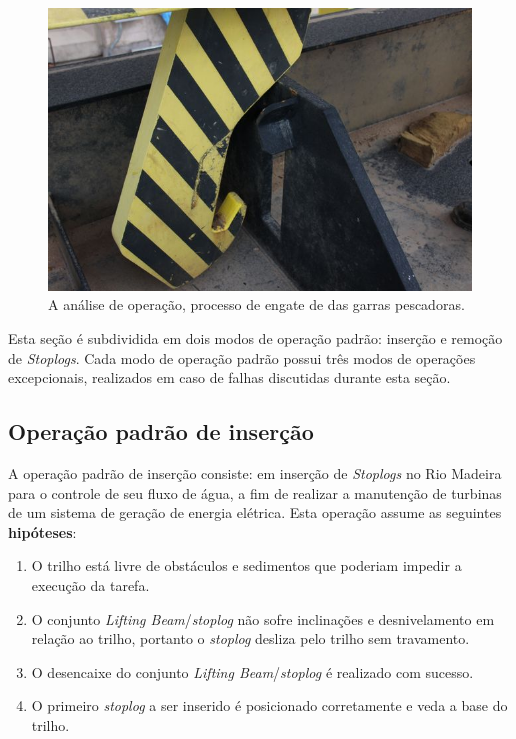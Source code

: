 \begin{figure}[h!]
    \centering \includegraphics[width=0.6\columnwidth]{figs/jirau/jirau_22}
    \caption{A análise de operação, processo de engate de das garras pescadoras.}
    \label{fig:jirau22}
\end{figure}



\clearpage

Esta seção é subdividida em dois modos de operação padrão: inserção e remoção de
\emph{Stoplogs}. Cada modo de operação padrão possui três modos de operações
excepcionais, realizados em caso de falhas discutidas durante esta seção.



\subsection{Operação padrão de inserção}
A operação padrão de inserção consiste: em inserção de \emph{Stoplogs} no Rio
Madeira para o controle de seu fluxo de água, a fim de realizar a manutenção de
turbinas de um sistema de geração de energia elétrica. Esta operação assume as
seguintes \textbf{hipóteses}:
\begin{enumerate}
\item O trilho está livre de obstáculos e sedimentos que poderiam impedir a execução da tarefa.
\label{hip:ins:1}
\item O conjunto \emph{Lifting Beam}/\emph{stoplog} não sofre inclinações e desnivelamento em relação ao trilho, portanto o \emph{stoplog} desliza pelo trilho sem travamento.
\item O desencaixe do conjunto \emph{Lifting Beam}/\emph{stoplog} é realizado com sucesso.
\item O primeiro \emph{stoplog} a ser inserido é posicionado corretamente e veda a base do trilho.
\label{hip:ins:4}
\end{enumerate}

